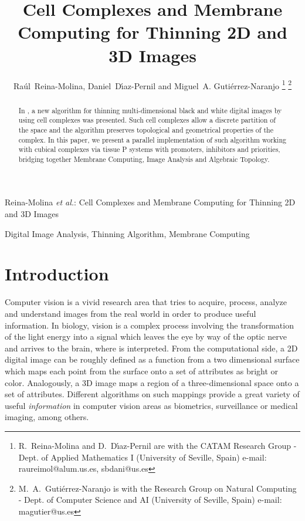\documentclass[journal]{IEEEtran}
\begin{document}
\title{Cell Complexes and Membrane Computing for Thinning 2D and 3D Images}

\author{
	Ra\'ul~Reina-Molina,
	Daniel~D\'{\i}az-Pernil and
	Miguel~A. Guti\'errez-Naranjo
\thanks{
	R.~Reina-Molina and D.~D\'{\i}az-Pernil are with the CATAM Research Group - Dept. of Applied Mathematics I
   (University of Seville, Spain)
   e-mail: raureimol@alum.us.es, sbdani@us.es
}
\thanks{
	M.~A.~Guti\'errez-Naranjo is with the Research Group on Natural Computing - Dept. of Computer Science and AI
	(University of Seville, Spain)
	e-mail: magutier@us.es
}}

%
{Reina-Molina \MakeLowercase{\textit{et al.}}: Cell Complexes and Membrane Computing for Thinning 2D and 3D Images}

\maketitle


\begin{abstract}
In \cite{liu20093d,DBLP:journals/cgf/LiuCLJ10}, a new algorithm for thinning multi-dimensional
black and white digital images by using cell complexes was
presented. Such cell complexes allow a discrete partition of the
space and the algorithm preserves topological and geometrical
properties of the complex. In this paper, we present a parallel
implementation of such algorithm working with cubical complexes via tissue P systems with
promoters, inhibitors and priorities, bridging together Membrane
Computing, Image Analysis and Algebraic Topology.
\end{abstract}

\begin{IEEEkeywords}
Digital Image Analysis, Thinning Algorithm, Membrane Computing
\end{IEEEkeywords}

\section{Introduction}
Computer vision \cite{ShapiroS01} is a vivid research area that
tries to acquire, process, analyze and understand images from the
real world in order to produce useful information. In biology,
vision is a complex process involving the transformation of the
light energy into a signal which leaves the eye by way of the optic
nerve and arrives to the brain, where is interpreted. From the
computational side, a 2D digital image can be roughly defined as a
function from a two dimensional surface which maps each point from
the surface onto a set of attributes as bright or color.
Analogously, a 3D image maps a region of a three-dimensional space onto
a set of attributes. Different algorithms on such mappings provide a
great variety of useful {\it information} in computer vision areas
as biometrics, surveillance or medical imaging, among others.
\end{document}
